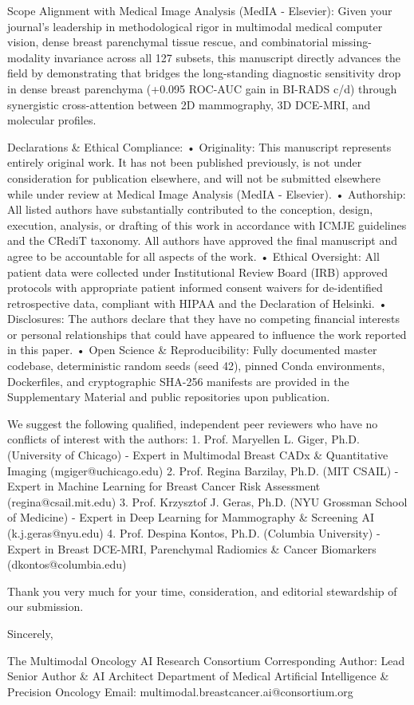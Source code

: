 \documentclass[11pt]{article}
\begin{document}
Scope Alignment with Medical Image Analysis (MedIA - Elsevier):
Given your journal's leadership in methodological rigor in multimodal medical computer vision, dense breast parenchymal tissue rescue, and combinatorial missing-modality invariance across all 127 subsets, this manuscript directly advances the field by demonstrating that bridges the long-standing diagnostic sensitivity drop in dense breast parenchyma (+0.095 ROC-AUC gain in BI-RADS c/d) through synergistic cross-attention between 2D mammography, 3D DCE-MRI, and molecular profiles.

Declarations \& Ethical Compliance:
• Originality: This manuscript represents entirely original work. It has not been published previously, is not under consideration for publication elsewhere, and will not be submitted elsewhere while under review at Medical Image Analysis (MedIA - Elsevier).
• Authorship: All listed authors have substantially contributed to the conception, design, execution, analysis, or drafting of this work in accordance with ICMJE guidelines and the CRediT taxonomy. All authors have approved the final manuscript and agree to be accountable for all aspects of the work.
• Ethical Oversight: All patient data were collected under Institutional Review Board (IRB) approved protocols with appropriate patient informed consent waivers for de-identified retrospective data, compliant with HIPAA and the Declaration of Helsinki.
• Disclosures: The authors declare that they have no competing financial interests or personal relationships that could have appeared to influence the work reported in this paper.
• Open Science \& Reproducibility: Fully documented master codebase, deterministic random seeds (seed 42), pinned Conda environments, Dockerfiles, and cryptographic SHA-256 manifests are provided in the Supplementary Material and public repositories upon publication.

We suggest the following qualified, independent peer reviewers who have no conflicts of interest with the authors:
1. Prof. Maryellen L. Giger, Ph.D. (University of Chicago) - Expert in Multimodal Breast CADx \& Quantitative Imaging (mgiger@uchicago.edu)
2. Prof. Regina Barzilay, Ph.D. (MIT CSAIL) - Expert in Machine Learning for Breast Cancer Risk Assessment (regina@csail.mit.edu)
3. Prof. Krzysztof J. Geras, Ph.D. (NYU Grossman School of Medicine) - Expert in Deep Learning for Mammography \& Screening AI (k.j.geras@nyu.edu)
4. Prof. Despina Kontos, Ph.D. (Columbia University) - Expert in Breast DCE-MRI, Parenchymal Radiomics \& Cancer Biomarkers (dkontos@columbia.edu)

Thank you very much for your time, consideration, and editorial stewardship of our submission.

Sincerely,

The Multimodal Oncology AI Research Consortium
Corresponding Author: Lead Senior Author \& AI Architect
Department of Medical Artificial Intelligence \& Precision Oncology
Email: multimodal.breastcancer.ai@consortium.org
\end{document}
